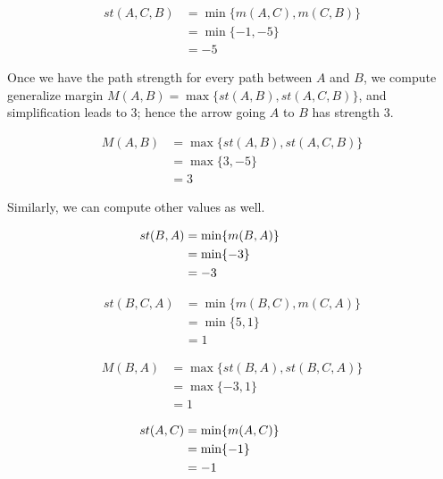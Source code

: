 \begin{align}
st (A, C, B)&=  \min \lbrace m (A, C), m (C, B) \rbrace  \nonumber \\
                     &= \min \lbrace -1, -5 \rbrace \nonumber \\
                     &= -5\nonumber
\end{align}

Once we have the path strength for every path between $A$ and $B$, we compute generalize margin 
$M(A, B) = \max \lbrace st (A, B), st(A, C, B) \rbrace$, and simplification leads to 3; hence the arrow going
$A$ to $B$ has strength 3.  


\begin{align}
M (A, B)&=  \max \lbrace st (A, B), st(A, C, B) \rbrace \nonumber \\
                     &= \max \lbrace 3, -5 \rbrace \nonumber \\
                     &= 3\nonumber
\end{align}

Similarly, we can compute other values as well. 

\begin{align}
\hspace{-3cm} st (B, A)&=  \min \lbrace m (B, A) \rbrace  \nonumber \\
					  &= \min \lbrace -3 \rbrace  \nonumber \\
                     &= -3 \nonumber
\end{align}


\begin{align}
st (B, C, A)&=  \min \lbrace m (B, C), m (C, A) \rbrace  \nonumber \\
                     &= \min \lbrace 5, 1 \rbrace \nonumber \\
                     &= 1\nonumber
\end{align}

\begin{align}
M (B, A)&=  \max \lbrace st (B, A), st(B, C, A) \rbrace \nonumber \\
                     &= \max \lbrace -3, 1 \rbrace \nonumber \\
                     &= 1\nonumber
\end{align}

\begin{align}
\hspace{-3cm} st (A, C)&=  \min \lbrace m (A, C) \rbrace  \nonumber \\
					  &= \min \lbrace -1 \rbrace  \nonumber \\
                     &= -1 \nonumber
\end{align}



